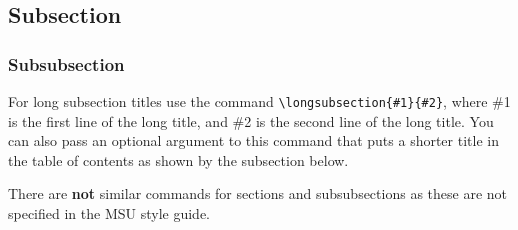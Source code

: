 \subsection{Subsection}\label{Sect:testsub}
\lipsum[2] %

\subsubsection{Subsubsection}\label{Sect:testsubsub}
\lipsum[3] %

\label{Sect:longsub}
For long subsection titles use the command \verb|\longsubsection{#1}{#2}|, where \#1 is the first line of the long title, and \#2 is the second line of the long title. You can also pass an optional argument to this command that puts a shorter title in the table of contents as shown by the subsection below.

\label{Sect:longsub2}
There are \textbf{not} similar commands for sections and subsubsections as these are not specified in the MSU style guide.  
\fi
